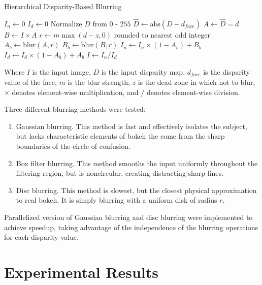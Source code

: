\documentclass[10pt,twocolumn,letterpaper]{article}
\begin{document}
\begin{algorithm}[h]
    \caption{Hierarchical Disparity-Based Blurring}
    \label{alg:blur}
\begin{algorithmic}
    \State $I_n \gets 0$
    \State $I_d \gets 0$
    \State $\text{Normalize } D \text{ from 0 - 255}$
    \State $\hat{D} \gets \text{abs}(D - d_{\textit{face}})$
        \State $A \gets  \hat{D} = d$
        \State $B \gets I \times A$
        \State $r \gets m \max{(d - z, 0)} \text{ rounded to nearest odd integer}$
        \State $A_b \gets \text{blur}(A, r)$
        \State $B_b \gets \text{blur}(B, r)$
        \State $I_n \gets I_n \times (1 - A_b) + B_b$
        \State $I_d \gets I_d \times (1 - A_b) + A_b$
    \EndFor
    \State $I \gets I_n / I_d$
\end{algorithmic}
\end{algorithm}

Where $I$ is the input image, $D$ is the input disparity map, $d_{\textit{face}}$ is the disparity value of the face, $m$ is the blur strength, $z$ is the dead zone in which not to blur, $\times$ denotes element-wise multiplication, and $/$ denotes element-wise division.

Three different blurring methods were tested:

\begin{enumerate}
    \item Gaussian blurring. This method is fast and effectively isolates the subject, but lacks characteristic elements of bokeh the come from the sharp boundaries of the circle of confusion.
    \item Box filter blurring. This method smooths the input uniformly throughout the filtering region, but is noncircular, creating distracting sharp lines.
    \item Disc blurring. This method is slowest, but the closest physical approximation to real bokeh. It is simply blurring with a uniform disk of radius $r$.
\end{enumerate}

Parallelized version of Gaussian blurring and disc blurring were implemented to achieve speedup, taking advantage of the independence of the blurring operations for each disparity value.

\section{Experimental Results}
\end{document}
